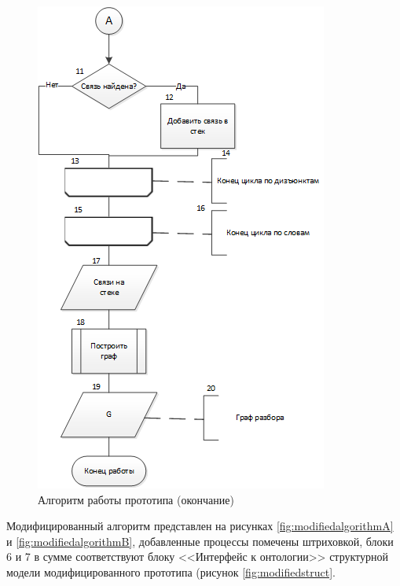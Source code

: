 \begin{figure}[H]
	\centering
		\includegraphics[scale=1.0]{images/initialalgorithmB.png}
	\caption{\small Алгоритм работы прототипа (окончание)}
	\label{fig:initialalgorithmB}
\end{figure}

Модифицированный алгоритм представлен на рисунках \ref{fig:modifiedalgorithmA} и \ref{fig:modifiedalgorithmB}, добавленные процессы помечены штриховкой, блоки 6 и 7 в сумме соответствуют блоку <<Интерфейс к онтологии>> структурной модели модифицированного прототипа (рисунок \ref{fig:modifiedstruct}.


